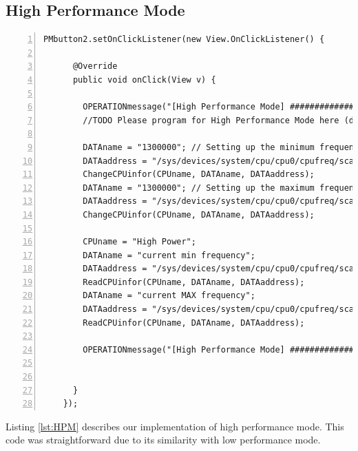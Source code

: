 \documentclass{article} %
\begin{document}
\subsection{High Performance Mode}
\begin{lstlisting}[float=*, caption={High Performance Mode},label={lst:HPM},numbers=left]
PMbutton2.setOnClickListener(new View.OnClickListener() {

      @Override
      public void onClick(View v) {

        OPERATIONmessage("[High Performance Mode] ###########################################");
        //TODO Please program for High Performance Mode here (done)

        DATAname = "1300000"; // Setting up the minimum frequency 1300 Mhz
        DATAaddress = "/sys/devices/system/cpu/cpu0/cpufreq/scaling_min_freq";
        ChangeCPUinfor(CPUname, DATAname, DATAaddress);
        DATAname = "1300000"; // Setting up the maximum frequency at 1300 MHz
        DATAaddress = "/sys/devices/system/cpu/cpu0/cpufreq/scaling_max_freq";
        ChangeCPUinfor(CPUname, DATAname, DATAaddress);

        CPUname = "High Power";
        DATAname = "current min frequency";
        DATAaddress = "/sys/devices/system/cpu/cpu0/cpufreq/scaling_min_freq";
        ReadCPUinfor(CPUname, DATAname, DATAaddress);
        DATAname = "current MAX frequency";
        DATAaddress = "/sys/devices/system/cpu/cpu0/cpufreq/scaling_max_freq";
        ReadCPUinfor(CPUname, DATAname, DATAaddress);

        OPERATIONmessage("[High Performance Mode] ###########################################");


      }
    });
\end{lstlisting}
Listing \ref{lst:HPM} describes our implementation of high performance mode. This code was straightforward due to its similarity with low performance mode.
\end{document}

